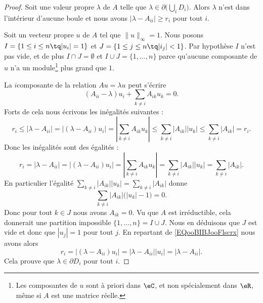 \begin{proof}
	Soit une valeur propre \( \lambda\) de \( A\) telle que \( \lambda\in \partial\big( \bigcup_iD_i \big)\). Alors \( \lambda\) n'est dans l'intérieur d'aucune boule et nous avons \( | \lambda-A_{ii} |\geq r_i\) pour tout \( i\).

	Soit un vecteur propre \( u\) de \( A\) tel que \( \| u \|_{\infty}=1\). Nous posons \( I= \{ 1\leq i\leq n \tq | u_i |=1 \}  \) et \( J=\{ 1\leq j\leq n\tq | i_j |<1 \}\). Par hypothèse \( I\) n'est pas vide, et de plus \( I\cap J=\emptyset\) et \( I\cup J=\{ 1,\ldots, n \}\) parce qu'aucune composante de \( u\) n'a un module\footnote{Les composantes de \( u\) sont à priori dans \( \eC\), et non spécialement dans \( \eR\), même si \( A\) est une matrice réelle.} plus grand que \( 1\).

	La \( i\)\ieme composante de la relation \( Au=\lambda u\) peut s'écrire
	\begin{equation}
		(A_{ii}-\lambda)u_i+\sum_{k\neq i}A_{ik}u_k=0.
	\end{equation}
	Forts de cela nous écrivons les inégalités suivantes :
	\begin{equation}
		r_i\leq | \lambda-A_{ii} |=\big| (\lambda-A_{ii})u_i \big|=| \sum_{k\neq i}A_{ik}u_k |\leq \sum_{k\neq i}| A_{ik} | |u_k |\leq \sum_{k\neq i}| A_{ik} |=r_i.
	\end{equation}
	Donc les inégalités sont des égalités :
	\begin{equation}        \label{EQooBIBJooFlscrx}
		r_i= | \lambda-A_{ii} |=\big| (\lambda-A_{ii})u_i \big|=| \sum_{k\neq i}A_{ik}u_k |=\sum_{k\neq i}| A_{ik} | |u_k |=\sum_{k\neq i}| A_{ik} |.
	\end{equation}
	En particulier l'égalité \( \sum_{k\neq i}| A_{ik} | |u_k |=\sum_{k\neq i}| A_{ik} |\) donne
	\begin{equation}
		\sum_{k\neq i}| A_{ik} |\big( | u_k |-1 \big)=0.
	\end{equation}
	Donc pour tout \( k\in J\) nous avons \( A_{ik}=0\). Vu que \( A\) est irréductible, cela donnerait une partition impossible \( \{ 1,\ldots, n \}=I\cup J\). Nous en déduisons que \( J\) est vide et donc que \( | u_j |=1\) pour tout $j$. En repartant de \eqref{EQooBIBJooFlscrx} nous avons alors
	\begin{equation}
		r_i=\big| (\lambda-A_{ii})u_i \big|=| \lambda-A_{ii} | |u_i |=| \lambda-A_{ii} |.
	\end{equation}
	Cela prouve que \( \lambda\in\partial D_i\) pour tout \( i\).
\end{proof}

